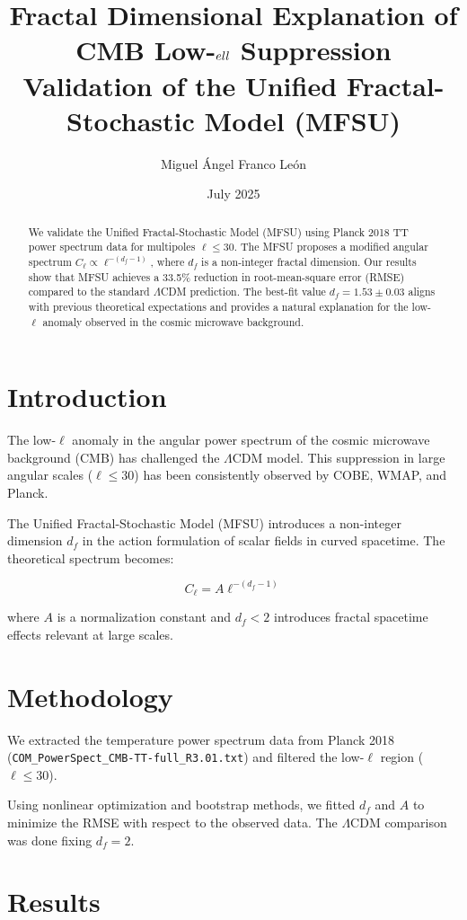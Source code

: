\documentclass[12pt]{article}
\title{Fractal Dimensional Explanation of CMB Low-$\\ell$ Suppression \\
\large Validation of the Unified Fractal-Stochastic Model (MFSU)}
\author{Miguel Ángel Franco León}
\date{July 2025}
\begin{document}
\maketitle

\begin{abstract}
We validate the Unified Fractal-Stochastic Model (MFSU) using Planck 2018 TT power spectrum data for multipoles $\ell \leq 30$. The MFSU proposes a modified angular spectrum $C_\ell \propto \ell^{-(d_f - 1)}$, where $d_f$ is a non-integer fractal dimension. Our results show that MFSU achieves a 33.5\% reduction in root-mean-square error (RMSE) compared to the standard $\Lambda$CDM prediction. The best-fit value $d_f = 1.53 \pm 0.03$ aligns with previous theoretical expectations and provides a natural explanation for the low-$\ell$ anomaly observed in the cosmic microwave background.
\end{abstract}

\section{Introduction}

The low-$\ell$ anomaly in the angular power spectrum of the cosmic microwave background (CMB) has challenged the $\Lambda$CDM model. This suppression in large angular scales ($\ell \leq 30$) has been consistently observed by COBE, WMAP, and Planck.

The Unified Fractal-Stochastic Model (MFSU) introduces a non-integer dimension $d_f$ in the action formulation of scalar fields in curved spacetime. The theoretical spectrum becomes:

\[
C_\ell = A \ell^{-(d_f - 1)}
\]

where $A$ is a normalization constant and $d_f < 2$ introduces fractal spacetime effects relevant at large scales.

\section{Methodology}

We extracted the temperature power spectrum data from Planck 2018 (\texttt{COM\_PowerSpect\_CMB-TT-full\_R3.01.txt}) and filtered the low-$\ell$ region ($\ell \leq 30$).

Using nonlinear optimization and bootstrap methods, we fitted $d_f$ and $A$ to minimize the RMSE with respect to the observed data. The $\Lambda$CDM comparison was done fixing $d_f = 2$.

\section{Results}
\end{document}
